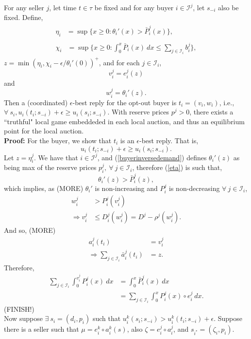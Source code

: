 \documentclass[12pt]{article}
\theoremstyle{definition}
\newcommand{\mcI}{\mathcal{I}}
\begin{document}
\begin{multicols}{2}
{
For any seller $j$, let time $t \in \tau$ be fixed and for any buyer $i\in
\mcI^j$, let $s_{-i}$ also be fixed. Define,
\begin{align}
\begin{split}\label{eta}
    \eta_i &= \sup\bigg\lbrace x\ge 0 : 
 {\theta_i}'(x) > \bar{P}_i^j(x)\bigg\rbrace, 
\end{split}\\
\begin{split}\label{chi}
    \chi_i &= \sup\bigg\lbrace x\ge 0: 
\displaystyle\int_0^x 
    \bar{P}_i(x) \ dx \le \sum_{j\in\mcI_i}b_i^j \bigg\rbrace,
\end{split}
\end{align}
$z = \min(\eta_i, \chi_i - \epsilon / \theta_i'(0))^+$, and for each $j \in
\mcI_i$, 
$$
    v_i^j = e_i^j(z) 
$$
and 
$$
    w_i^j = \theta_i'(z).%
$$
Then a (coordinated) $\epsilon$-best reply for the opt-out buyer is $t_i =
(v_i,w_i)$, i.e., $\forall \ s_i, u_i(t_i;s_{-i}) + \epsilon \ge u_i(s_i;
s_{-i})$.
With reserve prices $p^j >0$, there exists a ``truthful" local game embeddeded
in each local auction, and thus an equilibrium point for the local auction. 
}\\
\textbf{Proof:}
For the buyer, we show that $t_i$ is an $\epsilon$-best reply. That is,
$$
    u_i(t_i;s_{-i}) + \epsilon \ge u_i(s_i;s_{-i}).
$$
Let $z = \eta_i^j$. We have that $i\in\mcI^j$, 
and (\ref{buyerinversedemand}) defines $\theta_i'(z)$ as being
max of the reserve prices $p_i^j,\ \forall \ j\in\mcI_i$, therefore
(\ref{eta}) is such that,
$$
    \theta_i'(z) > \bar{P}_i^j(z),
$$ 
which implies, as (MORE) $\theta_i'$ is non-increasing and $P_i^j$ is
non-decreasing $\forall \ j \in \mcI_i$, 
\begin{align*}
    w_i^j &> P_i^j(v_i^j) \\
    \Rightarrow v_i^j &\le D_i^j(w_i^j) = D^j - \rho^j(w_i^j).
\end{align*}
And so, (MORE)
\begin{align*}
    a_i^j(t_i) &= v_i^j \\
    \Rightarrow \displaystyle\sum_{j\in\mcI_i} \bar{a}_i^j(t_i) &= z.
\end{align*}
Therefore,
\begin{align*}
    \displaystyle\sum_{j\in\mcI_i}\int_0^{v_i^j} P_i^j(x) \ dx &=  \int_0^{x}
    \bar{P}_i^j(x) \ dx \\
    &= \sum_{j\in\mcI_i}\int_0^x P_i^j(x) \circ e_i^j \ dx.
\end{align*}
(FINISH!)\\
Now suppose $\exists \ s_i = (d_i, p_i)$ such that $u_i^k(s_i;s_{-i}) > u_i^k(t_i;
s_{-i}) + \epsilon$. Suppose there is a seller such that $\mu = e_i^k\circ a_i^k(s)$, also $\zeta = e_i^j\circ
a_i^j$, and $s_{i^*} = (\zeta_i,p_i)$. 



\end{multicols}
\end{document}

